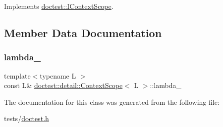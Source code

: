 Implements \hyperlink{structdoctest_1_1IContextScope_affbf0f9bf8107a4a8a805d237288141d}{doctest\+::\+I\+Context\+Scope}.



\subsection{Member Data Documentation}
\mbox{\label{classdoctest_1_1detail_1_1ContextScope_a9f7ddcea45f01c995765696017e31c3e}} 
\subsubsection{\texorpdfstring{lambda\+\_\+}{lambda\_}}
{\footnotesize\ttfamily template$<$typename L $>$ \\
const L\& \hyperlink{classdoctest_1_1detail_1_1ContextScope}{doctest\+::detail\+::\+Context\+Scope}$<$ L $>$\+::lambda\+\_\+\hspace{0.3cm}{\ttfamily [private]}}



The documentation for this class was generated from the following file\+:\begin{DoxyCompactItemize}
\item 
tests/\hyperlink{doctest_8h}{doctest.\+h}\end{DoxyCompactItemize}
